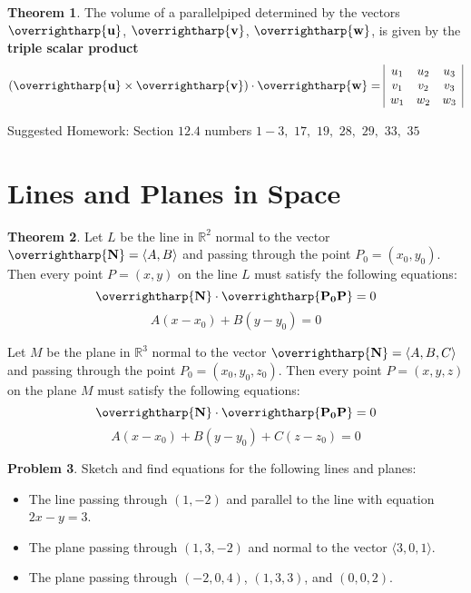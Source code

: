 \documentclass[letterpaper, twoside, 12pt]{book}
\newcommand{\<}{\langle}
\renewcommand{\>}{\rangle}
\theoremstyle{definition}
\newtheorem{theorem}{Theorem}
\theoremstyle{definition}
\newtheorem{problem}[theorem]{Problem}
\newcommand{\harpvec}[1]{\overrightharp{\ensuremath{\mathbf{#1}}}}
\begin{document}
\begin{theorem}
  The volume of a parallelpiped determined by the vectors
  $\harpvec{u}$, $\harpvec{v}$, $\harpvec{w}$, is given by
  the \textbf{triple scalar product}
    \[
      (\harpvec{u}\times\harpvec{v})\cdot\harpvec{w} =
      \begin{array}{|c c c|}
      u_1 & u_2 & u_3 \\
      v_1 & v_2 & v_3 \\
      w_1 & w_2 & w_3 \\
      \end{array}
    \]
\end{theorem}

\noindent Suggested Homework:
Section $12.4$ numbers $1 - 3,$ $17,$ $19,$ $28,$ $29,$ $33,$ $35$

\newpage

\section{Lines and Planes in Space}

\begin{theorem}
  Let $L$ be the line in $\mathbb R^2$ normal to the vector $\harpvec N=\<A,B\>$
  and passing through the point $P_0=(x_0,y_0)$. Then every point $P=(x,y)$
  on the line $L$ must satisfy the following equations:
  \[
    \harpvec N \cdot \harpvec{P_0P} = 0
  \]
  \[
    A(x-x_0) + B(y-y_0) = 0
  \]

  Let $M$ be the plane in $\mathbb R^3$ normal to the vector $\harpvec N=\<A,B,C\>$
  and passing through the point $P_0=(x_0,y_0,z_0)$. Then every point $P=(x,y,z)$
  on the plane $M$ must satisfy the following equations:
  \[
    \harpvec N \cdot \harpvec{P_0P} = 0
  \]
  \[
    A(x-x_0) + B(y-y_0) + C(z-z_0) = 0
  \]
\end{theorem}

\begin{problem}
  Sketch and find equations for the following lines and planes:
  \begin{itemize}
    \item The line passing through $(1,-2)$ and parallel to the line with
          equation $2x-y=3$.
    \item The plane passing through $(1,3,-2)$ and normal to the vector
          $\<3,0,1\>$.
    \item The plane passing through $(-2,0,4)$, $(1,3,3)$, and $(0,0,2)$.
  \end{itemize}
\end{problem}
\end{document}
